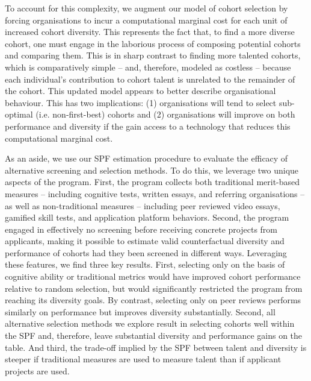 To account for this complexity, we augment our model of cohort selection by forcing organisations to incur a computational marginal cost for each unit of increased cohort diversity. This represents the fact that, to find a more diverse cohort, one must engage in the laborious process of composing potential cohorts and comparing them. This is in sharp contrast to finding more talented cohorts, which is comparatively simple -- and, therefore, modeled as costless -- because each individual's contribution to cohort talent is unrelated to the remainder of the cohort. This updated model appears to better describe organisational behaviour. This has two implications: (1) organisations will tend to select sub-optimal (i.e. non-first-best) cohorts and (2) organisations will improve on both performance and diversity if the gain access to a technology that reduces this computational marginal cost. 

As an aside, we use our SPF estimation procedure to evaluate the efficacy of alternative screening and selection methods. To do this, we leverage two unique aspects of the program. First, the program collects both traditional merit-based measures -- including cognitive tests, written essays, and referring organisations -- as well as non-traditional measures -- including peer reviewed video essays, gamified skill tests, and application platform behaviors. Second, the program engaged in effectively no screening before receiving concrete projects from applicants, making it possible to estimate valid counterfactual diversity and performance of cohorts had they been screened in different ways. Leveraging these features, we find three key results. First, selecting only on the basis of cognitive ability or traditional metrics would have improved cohort performance relative to random selection, but would significantly restricted the program from reaching its diversity goals. By contrast, selecting only on peer reviews performs similarly on performance but improves diversity substantially. Second, all alternative selection methods we explore result in selecting cohorts well within the SPF and, therefore, leave substantial diversity and performance gains on the table. And third, the trade-off implied by the SPF between talent and diversity is steeper if traditional measures are used to measure talent than if applicant projects are used. 

